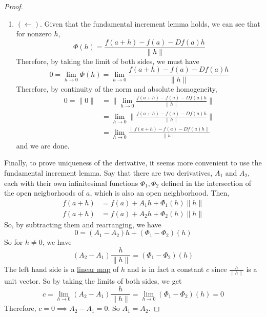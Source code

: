 \begin{proof}
\begin{enumerate}
			\item $(\leftarrow)$. Given that the fundamental increment lemma holds, we can see that for nonzero $h$, 
				\begin{equation}
					\Phi(h) = \frac{f(a + h) - f(a) - Df(a) h}{\|h\|}
				\end{equation} 
				Therefore, by taking the limit of both sides, we must have 
				\begin{equation}
					0 = \lim_{h \to 0} \Phi(h) = \lim_{h \to 0} \frac{f(a + h) - f(a) - Df(a) h}{\|h\|}
				\end{equation}
				Therefore, by continuity of the norm and absolute homogeneity, 
				\begin{align}
					0 = \|0\| & = \bigg\| \lim_{h \to 0} \frac{f(a + h) - f(a) - Df(a) h}{\|h\|} \bigg\| \\ 
										& = \lim_{h \to 0} \bigg\| \frac{f(a + h) - f(a) - Df(a) h}{\|h\|} \bigg\| \\ 
										& = \lim_{h \to 0} \frac{\| f(a + h) - f(a) - Df(a) h\|}{\|h\|}
				\end{align}
				and we are done. 
		\end{enumerate}
		Finally, to prove uniqueness of the derivative, it seems more convenient to use the fundamental increment lemma. Say that there are two derivatives, $A_1$ and $A_2$, each with their own infinitesimal functions $\Phi_1, \Phi_2$ defined in the intersection of the open neigborhoods of $a$, which is also an open neighborhood. Then, 
		\begin{align}
			f(a + h) & = f(a) + A_1 h + \Phi_1 (h) \|h\| \\ 
			f(a + h) & = f(a) + A_2 h + \Phi_2 (h) \|h\| 
		\end{align}
		So, by subtracting them and rearranging, we have 
		\begin{equation}
		  0 = (A_1 - A_2) h + (\Phi_1 - \Phi_2)(h)
		\end{equation}
		So for $h \neq 0$, we have 
		\begin{equation}
			(A_2 - A_1) \frac{h}{\|h\|} = (\Phi_1 - \Phi_2) (h)
		\end{equation}
		The left hand side is a \hyperref[lin-def:linear_map]{linear map} of $h$ and is in fact a constant $c$ since $\frac{h}{\|h\|}$ is a unit vector. So by taking the limits of both sides, we get 
		\begin{equation}
			c = \lim_{h \to 0} (A_2 - A_1) \frac{h}{\|h\|} = \lim_{h \to 0} (\Phi_1 - \Phi_2) (h) = 0
		\end{equation} 
		Therefore, $c = 0 \implies A_2 - A_1 = 0$. So $A_1 = A_2$. 
  \end{proof} 

